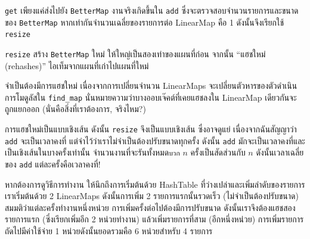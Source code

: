 {\tt get} เพียงแค่ส่งไปยัง {\tt BetterMap} 
งานจริงเกิดขึ้นใน {\tt add} ซึ่งจะตรวจสอบจำนวนรายการและขนาดของ {\tt BetterMap} 
หากเท่ากันจำนวนเฉลี่ยของรายการต่อ LinearMap คือ 1 ดังนั้นจึงเรียกใช้ {\tt resize}



{\tt resize} สร้าง {\tt BetterMap} ใหม่ ให้ใหญ่เป็นสองเท่าของแผนที่ก่อน จากนั้น ``แฮชใหม่ (rehashes)'' ไอเท็มจากแผนที่เก่าไปแผนที่ใหม่


จำเป็นต้องมีการแฮชใหม่ เนื่องจากการเปลี่ยนจำนวน LinearMaps จะเปลี่ยนตัวหารของตัวดำเนินการโมดูลัสใน \verb"find_map" 
นั่นหมายความว่าบางออบเจ๊คต์ที่เคยแฮชลงใน LinearMap เดียวกันจะถูกแยกออก (นั่นคือสิ่งที่เราต้องการ, จริงไหม?)


การแฮชใหม่เป็นแบบเชิงเส้น ดังนั้น {\tt resize} จึงเป็นแบบเชิงเส้น 
ซึ่งอาจดูแย่ เนื่องจากฉันสัญญาว่า {\tt add} จะเป็นเวลาคงที่ แต่จำไว้ว่าเราไม่จำเป็นต้องปรับขนาดทุกครั้ง 
ดังนั้น {\tt add} มักจะเป็นเวลาคงที่และเป็นเชิงเส้นในบางครั้งเท่านั้น 
จำนวนงานที่จะรันทั้งหมด{\tt บวก} $n$ ครั้งเป็นสัดส่วนกับ $n$ ดังนั้นเวลาเฉลี่ยของ {\tt add} แต่ละครั้งคือเวลาคงที่!


หากต้องการดูวิธีการทำงาน ให้นึกถึงการเริ่มต้นด้วย HashTable ที่ว่างเปล่าและเพิ่มลำดับของรายการ
เราเริ่มต้นด้วย 2 LinearMaps ดังนั้นการเพิ่ม 2 รายการแรกนั้นรวดเร็ว (ไม่จำเป็นต้องปรับขนาด) 
สมมติว่าแต่ละครั้งทำงานหนึ่งหน่วย การเพิ่มครั้งต่อไปต้องมีการปรับขนาด ดังนั้นเราจึงต้องแฮชสองรายการแรก (ซึ๋งเรียกเพิ่มอีก 2 หน่วยทำงาน) 
แล้วเพิ่มรายการที่สาม (อีกหนึ่งหน่วย) การเพิ่มรายการถัดไปมีค่าใช้จ่าย 1 หน่วยดังนั้นยอดรวมคือ 6 หน่วยสำหรับ 4 รายการ


